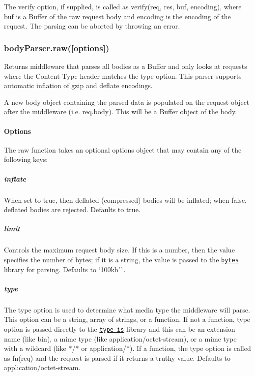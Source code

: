 The {\ttfamily verify} option, if supplied, is called as {\ttfamily verify(req, res, buf, encoding)}, where {\ttfamily buf} is a {\ttfamily Buffer} of the raw request body and {\ttfamily encoding} is the encoding of the request. The parsing can be aborted by throwing an error.

\subsubsection*{body\+Parser.\+raw(\mbox{[}options\mbox{]})}

Returns middleware that parses all bodies as a {\ttfamily Buffer} and only looks at requests where the {\ttfamily Content-\/\+Type} header matches the {\ttfamily type} option. This parser supports automatic inflation of {\ttfamily gzip} and {\ttfamily deflate} encodings.

A new {\ttfamily body} object containing the parsed data is populated on the {\ttfamily request} object after the middleware (i.\+e. {\ttfamily req.\+body}). This will be a {\ttfamily Buffer} object of the body.

\paragraph*{Options}

The {\ttfamily raw} function takes an optional {\ttfamily options} object that may contain any of the following keys\+:

\subparagraph*{inflate}

When set to {\ttfamily true}, then deflated (compressed) bodies will be inflated; when {\ttfamily false}, deflated bodies are rejected. Defaults to {\ttfamily true}.

\subparagraph*{limit}

Controls the maximum request body size. If this is a number, then the value specifies the number of bytes; if it is a string, the value is passed to the \href{https://www.npmjs.com/package/bytes}{\tt bytes} library for parsing. Defaults to `\textquotesingle{}100kb'\`{}.

\subparagraph*{type}

The {\ttfamily type} option is used to determine what media type the middleware will parse. This option can be a string, array of strings, or a function. If not a function, {\ttfamily type} option is passed directly to the \href{https://www.npmjs.org/package/type-is#readme}{\tt type-\/is} library and this can be an extension name (like {\ttfamily bin}), a mime type (like {\ttfamily application/octet-\/stream}), or a mime type with a wildcard (like {\ttfamily $\ast$/$\ast$} or {\ttfamily application/$\ast$}). If a function, the {\ttfamily type} option is called as {\ttfamily fn(req)} and the request is parsed if it returns a truthy value. Defaults to {\ttfamily application/octet-\/stream}.

